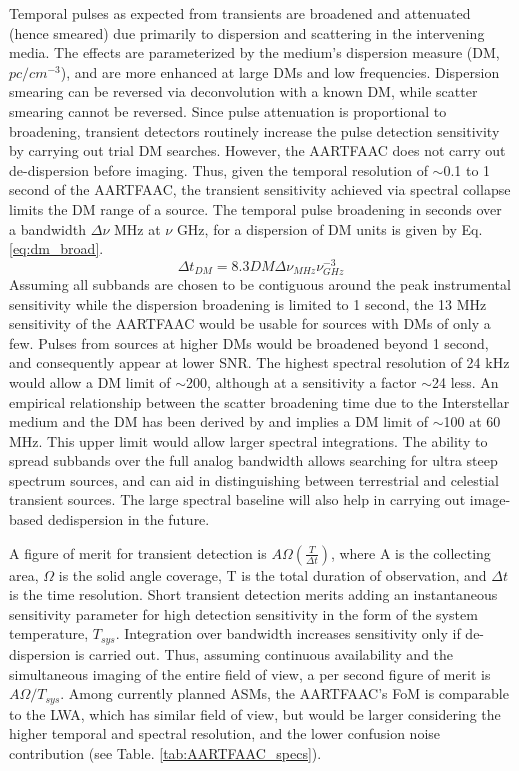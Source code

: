 \documentclass{aa}
\begin{document}
Temporal pulses as expected from  transients are broadened and attenuated (hence
smeared)  due  primarily  to   dispersion  and  scattering  in  the  intervening
media. The  effects are  parameterized by the  medium's dispersion  measure (DM,
$pc/cm^{-3}$),    and   are    more   enhanced    at   large    DMs    and   low
frequencies. Dispersion smearing can be  reversed via deconvolution with a known
DM,  while scatter  smearing cannot  be  reversed.  Since  pulse attenuation  is
proportional  to broadening,  transient detectors  routinely increase  the pulse
detection sensitivity by carrying out  trial DM searches.  However, the AARTFAAC
does  not carry  out de-dispersion  before  imaging.  Thus,  given the  temporal
resolution of $\sim$0.1  to 1 second of the  AARTFAAC, the transient sensitivity
achieved via  spectral collapse limits the  DM range of a  source.  The temporal
pulse broadening in seconds over a bandwidth $\Delta\nu$ MHz at $\nu$ GHz, for a
dispersion of DM units is given by Eq. \ref{eq:dm_broad}.
\begin{equation}
\Delta t_{DM}=8.3DM\Delta\nu_{MHz}\nu_{GHz}^{-3}\label{eq:dm_broad}
\end{equation}
Assuming all subbands  are chosen to be contiguous  around the peak instrumental
sensitivity while the  dispersion broadening is limited to 1  second, the 13 MHz
sensitivity  of the AARTFAAC  would be  usable for  sources with  DMs of  only a
few. Pulses from  sources at higher DMs would be broadened  beyond 1 second, and
consequently appear  at lower  SNR.  The highest  spectral resolution of  24 kHz
would allow a DM limit of $\sim$200, although at a sensitivity a factor $\sim$24
less.  An empirical relationship between  the scatter broadening time due to the
Interstellar     medium     and    the     DM     has     been    derived     by
\citep{bhat2004multifrequency}  and  implies  a  DM  limit of  $\sim$100  at  60
MHz. This upper  limit would allow larger spectral  integrations. The ability to
spread subbands over the full  analog bandwidth allows searching for ultra steep
spectrum  sources,  and  can  aid  in  distinguishing  between  terrestrial  and
celestial  transient sources.   The large  spectral baseline  will also  help in
carrying out image-based dedispersion in the future.

A   figure  of   merit  for   transient   detection\citep{cordes2004dynamic}  is
$A\Omega\left(\frac{T}{\Delta  t}\right)$,  where  A  is  the  collecting  area,
$\Omega$ is  the solid angle coverage,  T is the total  duration of observation,
and $\Delta t$  is the time resolution. Short  transient detection merits adding
an  instantaneous sensitivity parameter  for high  detection sensitivity  in the
form of the system  temperature, $T_{sys}$. Integration over bandwidth increases
sensitivity  only if de-dispersion  is carried  out.  Thus,  assuming continuous
availability and  the simultaneous imaging  of the entire  field of view,  a per
second figure of  merit is $A\Omega/T_{sys}$. Among currently  planned ASMs, the
AARTFAAC's FoM  is comparable to the LWA,  which has similar field  of view, but
would be larger considering the higher temporal and spectral resolution, and the
lower confusion noise contribution (see Table. \ref{tab:AARTFAAC_specs}).
\end{document}
